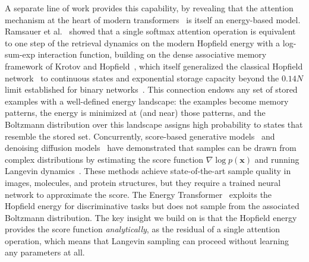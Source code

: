 A separate line of work provides this capability, by revealing that the attention mechanism at the heart of modern transformers~\cite{vaswaniAttentionAllYou2017} is itself an energy-based model. Ramsauer et al.~\cite{ramsauerHopfieldNetworksAll2021} showed that a single softmax attention operation is equivalent to one step of the retrieval dynamics on the modern Hopfield energy with a log-sum-exp interaction function, building on the dense associative memory framework of Krotov and Hopfield~\cite{krotovDenseAssociativeMemory2016}, which itself generalized the classical Hopfield network~\cite{hopfieldNeuralNetworksPhysical1982} to continuous states and exponential storage capacity beyond the $0.14N$ limit established for binary networks~\cite{amitStoringInfiniteNumbers1985}. This connection endows any set of stored examples with a well-defined energy landscape: the examples become memory patterns, the energy is minimized at (and near) those patterns, and the Boltzmann distribution over this landscape assigns high probability to states that resemble the stored set. Concurrently, score-based generative models~\cite{songGenerativeModelingEstimating2019,songScoreBasedGenerativeModeling2021} and denoising diffusion models~\cite{hoDenoisingDiffusionProbabilistic2020} have demonstrated that samples can be drawn from complex distributions by estimating the score function $\nabla \log p(\mathbf{x})$ and running Langevin dynamics~\cite{wellingBayesianLearningStochastic2011}. These methods achieve state-of-the-art sample quality in images, molecules, and protein structures, but they require a trained neural network to approximate the score. The Energy Transformer~\cite{hooverEnergyTransformer2023} exploits the Hopfield energy for discriminative tasks but does not sample from the associated Boltzmann distribution. The key insight we build on is that the Hopfield energy provides the score function \emph{analytically}, as the residual of a single attention operation, which means that Langevin sampling can proceed without learning any parameters at all.

